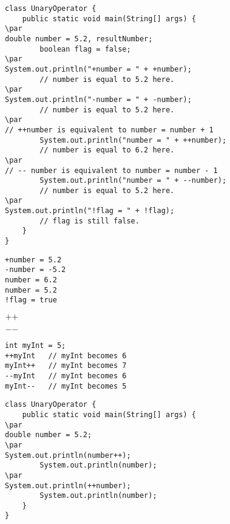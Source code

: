 \documentclass{book}
\def\lthtmlcheckvsize{\ifdim\ht\sizebox<\vsize 
  \ifdim\wd\sizebox<\hsize\expandafter\hfill\fi \expandafter\vfill
  \else\expandafter\vss\fi}%
\begin{document}
{\newpage\clearpage
{}%
\begin{lstlisting}
class UnaryOperator {
    public static void main(String[] args) {
\par
double number = 5.2, resultNumber;
        boolean flag = false;
\par
System.out.println("+number = " + +number);
        // number is equal to 5.2 here.
\par
System.out.println("-number = " + -number);
        // number is equal to 5.2 here.
\par
// ++number is equivalent to number = number + 1
        System.out.println("number = " + ++number);
        // number is equal to 6.2 here.
\par
// -- number is equivalent to number = number - 1
        System.out.println("number = " + --number);
        // number is equal to 5.2 here.
\par
System.out.println("!flag = " + !flag);
        // flag is still false.
    }
}
\end{lstlisting}%
\lthtmlfigureZ
\lthtmlcheckvsize\clearpage}

{\newpage\clearpage
{}%
\begin{lstlisting}
+number = 5.2
-number = -5.2
number = 6.2
number = 5.2
!flag = true
\end{lstlisting}%
\lthtmlfigureZ
\lthtmlcheckvsize\clearpage}

{\newpage\clearpage
{}%
$\lstinline{++}$%
\lthtmlindisplaymathZ
\lthtmlcheckvsize\clearpage}

{\newpage\clearpage
{}%
$\lstinline{--}$%
\lthtmlindisplaymathZ
\lthtmlcheckvsize\clearpage}

{\newpage\clearpage
{}%
\begin{lstlisting}
int myInt = 5;
++myInt   // myInt becomes 6
myInt++   // myInt becomes 7
--myInt   // myInt becomes 6
myInt--   // myInt becomes 5
\end{lstlisting}%
\lthtmlfigureZ
\lthtmlcheckvsize\clearpage}

{\newpage\clearpage
{}%
\begin{lstlisting}
class UnaryOperator {
    public static void main(String[] args) {
\par
double number = 5.2;
\par
System.out.println(number++);
        System.out.println(number);
\par
System.out.println(++number);
        System.out.println(number);
    }
}
\end{lstlisting}%
\lthtmlfigureZ
\lthtmlcheckvsize\clearpage}
\end{document}
